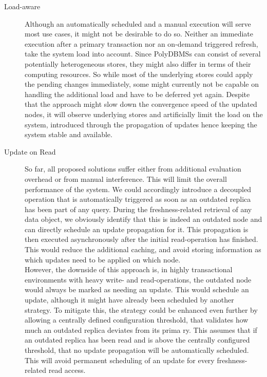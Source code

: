 \begin{description}
    \item[Load-aware] Although an automatically scheduled and a manual execution will serve most use cases, it might not be desirable to do so.
    Neither an immediate execution after a primary transaction nor an on-demand triggered refresh, take the system load into account.
    Since PolyDBMSs can consist of several potentially heterogeneous stores, they might also differ in terms of their computing resources.
    So while most of the underlying stores could apply the pending changes immediately, some might currently not be capable on handling the additional load and have to 
    be deferred yet again. Despite that the approach might slow down the convergence speed of the updated nodes, 
    it will observe underlying stores and artificially limit the load on the system, introduced through the propagation of updates hence keeping the system stable and available.

    \item[Update on Read] So far, all proposed solutions suffer either from additional evaluation overhead or from manual interference. This will limit the overall 
    performance of the system. We could accordingly introduce a decoupled operation that is automatically triggered as soon as an outdated replica has been part of any query. 
    During the freshness-related retrieval of any data object, we obviously identify that this is indeed an outdated node and can directly schedule an update propagation for it. This propagation is then
    executed asynchronously after the initial read-operation has finished. This would reduce the additional caching, and avoid storing 
    information as which updates need to be applied on which node.\\
    However, the downside of this approach is, in highly transactional environments with heavy write- and read-operations, the outdated node would always be marked as 
    needing an update. This would schedule an update, although it might have already been scheduled by another strategy. 
    To mitigate this, the strategy could be enhanced even further by allowing a centrally defined configuration threshold, that validates how much an outdated replica deviates from its prima
    ry. 
    This assumes that if an outdated replica has been read and is above the centrally configured threshold, that no update propagation will be automatically scheduled.
    This will avoid permanent scheduling of an update for every freshness-related read access.

\end{description}





